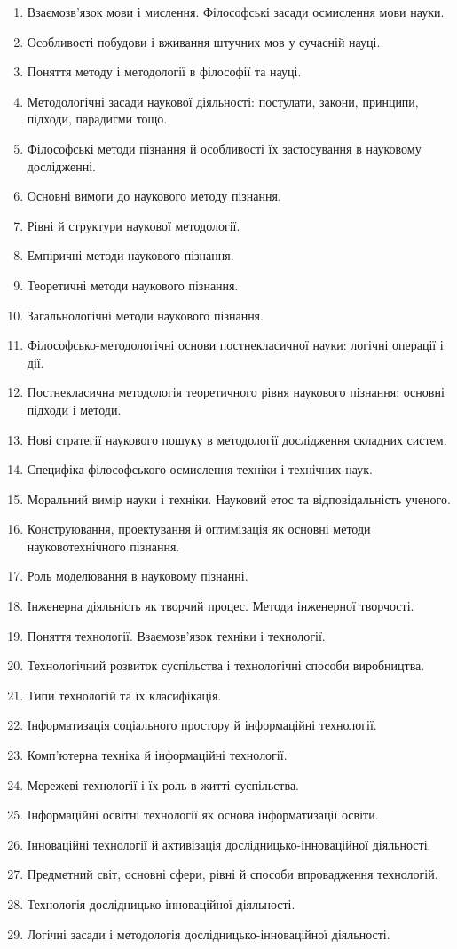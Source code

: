 \begin{enumerate}
\item Взаємозв’язок мови і мислення. Філософські засади осмислення мови науки.
\item Особливості побудови і вживання штучних мов у сучасній науці.
\item Поняття методу і методології в філософії та науці.
\item Методологічні засади наукової діяльності: постулати, закони, принципи, підходи, парадигми тощо.
\item Філософські методи пізнання й особливості їх застосування в науковому дослідженні.
\item Основні вимоги до наукового методу пізнання.
\item Рівні й структури наукової методології.
\item Емпіричні методи наукового пізнання.
\item Теоретичні методи наукового пізнання.
\item Загальнологічні методи наукового пізнання.
\item Філософсько-методологічні основи постнекласичної науки: логічні операції і дії.
\item Постнекласична методологія теоретичного рівня наукового пізнання: основні підходи і методи.
\item Нові стратегії наукового пошуку в методології дослідження складних систем.
\item Специфіка філософського осмислення техніки і технічних наук.
\item Моральний вимір науки і техніки. Науковий етос та відповідальність ученого.
\item Конструювання, проектування й оптимізація як основні методи науковотехнічного пізнання.
\item Роль моделювання в науковому пізнанні.
\item Інженерна діяльність як творчий процес. Методи інженерної творчості.
\item Поняття технології. Взаємозв’язок техніки і технології.
\item Технологічний розвиток суспільства і технологічні способи виробництва.
\item Типи технологій та їх класифікація.
\item Інформатизація соціального простору й інформаційні технології.
\item Комп’ютерна техніка й інформаційні технології.
\item Мережеві технології і їх роль в житті суспільства.
\item Інформаційні освітні технології як основа інформатизації освіти.
\item Інноваційні технології й активізація дослідницько-інноваційної діяльності.
\item Предметний світ, основні сфери, рівні й способи впровадження технологій.
\item Технологія дослідницько-інноваційної діяльності.
\item Логічні засади і методологія дослідницько-інноваційної діяльності. 
\end{enumerate}


